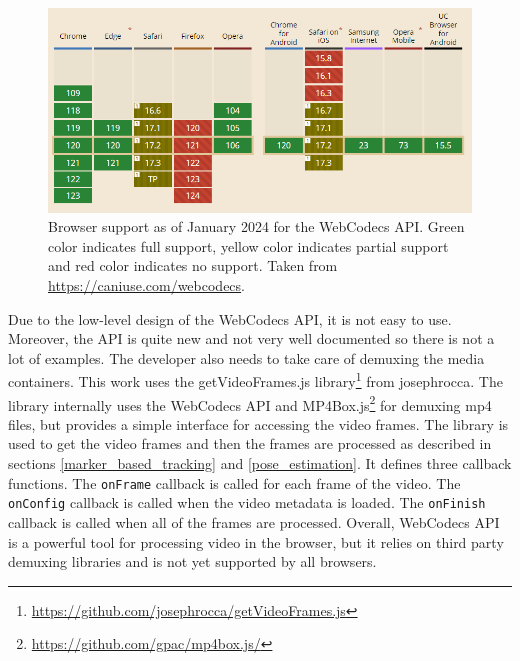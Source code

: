 \begin{figure}[htbp]
    \centering
    \includegraphics[width=\textwidth]{obrazky-figures/caniuseWebcodecs.png}
    \caption{Browser support as of January 2024 for the WebCodecs API. Green color indicates full support, yellow color indicates partial support and red color indicates no support. Taken from \url{https://caniuse.com/webcodecs}.}
    \label{fig:caniuseWebcodecs}
\end{figure}

Due to the low-level design of the WebCodecs API, it is not easy to use. Moreover, the API is quite new and not very well documented so there is not a lot of examples. The developer also needs to take care of demuxing the media containers. This work uses the getVideoFrames.js library\footnote{\url{https://github.com/josephrocca/getVideoFrames.js}} from josephrocca. The library internally uses the WebCodecs API and MP4Box.js\footnote{\url{https://github.com/gpac/mp4box.js/}} for demuxing mp4 files, but provides a simple interface for accessing the video frames. The library is used to get the video frames and then the frames are processed as described in sections \ref{marker_based_tracking} and \ref{pose_estimation}. It defines three callback functions. The \texttt{onFrame} callback is called for each frame of the video. The \texttt{onConfig} callback is called when the video metadata is loaded. The \texttt{onFinish} callback is called when all of the frames are processed. Overall, WebCodecs API is a powerful tool for processing video in the browser, but it relies on third party demuxing libraries and is not yet supported by all browsers.


